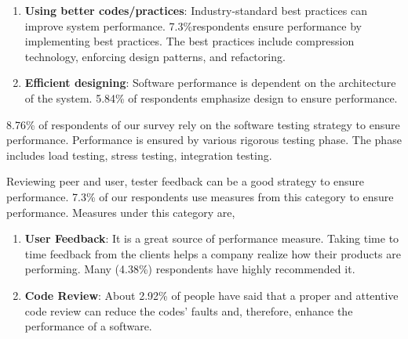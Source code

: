 \begin{enumerate}[label=(\alph*)]

    \item \textbf{Using better codes/practices}: Industry-standard best practices can improve system performance. 7.3\%respondents ensure performance by implementing best practices. The best practices include compression technology, enforcing design patterns, and refactoring.
    
    \item \textbf{Efficient designing}: Software performance is dependent on the architecture of the system. 5.84\% of respondents emphasize design to ensure performance.

\end{enumerate}

 8.76\% of respondents of our survey rely on the software testing strategy to ensure performance. Performance is ensured by various rigorous testing phase. The phase includes load testing, stress testing, integration testing.
 
 Reviewing peer and user, tester feedback can be a good strategy to ensure performance. 7.3\% of our respondents use measures from this category to ensure performance. Measures under this category are,
 
 \begin{enumerate}[label=(\alph*)]
 
     \item \textbf{User Feedback}: It is a great source of performance measure. Taking time to time feedback from the clients helps a company realize how their products are performing. Many (4.38\%) respondents have highly recommended it.
    
    \item \textbf{Code Review}: About 2.92\% of people have said that a proper and attentive code review can reduce the codes' faults and, therefore, enhance the performance of a software.
 
 \end{enumerate}


